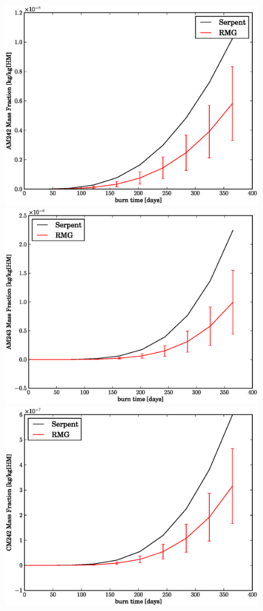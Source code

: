 \begin{figure}[htbp]
\begin{center}
\includegraphics[scale=0.3]{multigroup_method/figs/benchmark/AM242_Mass_Fraction_.eps}
\includegraphics[scale=0.3]{multigroup_method/figs/benchmark/AM243_Mass_Fraction_.eps}
\includegraphics[scale=0.3]{multigroup_method/figs/benchmark/CM242_Mass_Fraction_.eps}

\end{center}
\end{figure}

